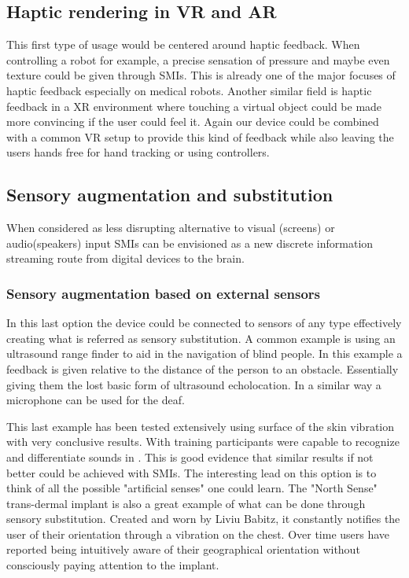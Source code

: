 \documentclass[10pt,journal,compsoc]{IEEEtran}
\begin{document}
	\subsection{Haptic rendering in VR and AR}
	This first type of usage would be centered around haptic feedback.
	When controlling a robot for example, a precise sensation of pressure and maybe even texture could be given through SMIs. This is already one of the major focuses of haptic feedback especially on medical robots.
	Another similar field is haptic feedback in a XR environment where touching a virtual object could be made more convincing if the user could feel it. Again our device could be combined with a common VR setup to provide this kind of feedback while also leaving the users hands free for hand tracking or using controllers. 
	
	\subsection{Sensory augmentation and substitution}
	When considered as less disrupting alternative to visual (screens) or audio(speakers) input SMIs can be envisioned as a new discrete information streaming route from digital devices to the brain. 
	
		\subsubsection{Sensory augmentation based on external sensors}
		In this last option the device could be connected to sensors of any type effectively creating what is referred as sensory substitution. A common example is using an ultrasound range finder to aid in the navigation of blind people. In this example a feedback is given relative to the distance of the person to an obstacle. Essentially giving them the lost basic form of ultrasound echolocation. In a similar way a microphone can be used for the deaf. 
		
		This last example has been tested extensively using surface of the skin vibration with very conclusive results. With training participants were capable to recognize and differentiate sounds in \cite{perrotta2021neuroscience}. This is good evidence that similar results if not better could be achieved with SMIs. The interesting lead on this option is to think of all the possible "artificial senses" one could learn. The "North Sense" trans-dermal implant is also a great example of what can be done through sensory substitution. Created and worn by Liviu Babitz, it constantly notifies the user of their orientation through a vibration on the chest. Over time users have reported being intuitively aware of their geographical orientation without consciously paying attention to the implant.
		
\end{document}
